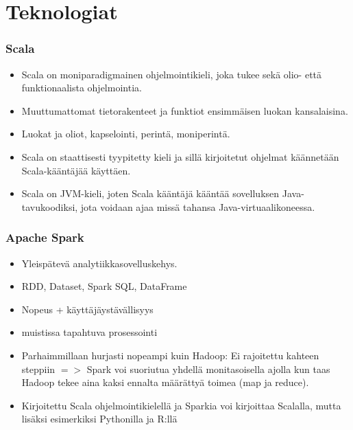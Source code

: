 \documentclass{beamer}
\begin{document}
\section{Teknologiat}

\begin{frame}
\frametitle{Scala}

\begin{itemize}
	\item Scala on moniparadigmainen ohjelmointikieli, joka tukee sekä olio- että funktionaalista ohjelmointia.
	\item Muuttumattomat tietorakenteet ja funktiot ensimmäisen luokan kansalaisina.
	\item Luokat ja oliot, kapselointi, perintä, moniperintä.
	\item Scala on staattisesti tyypitetty kieli ja sillä kirjoitetut ohjelmat käännetään Scala-kääntäjää käyttäen.
	\item Scala on JVM-kieli, joten Scala kääntäjä kääntää sovelluksen Java-tavukoodiksi, jota voidaan ajaa missä tahansa Java-virtuaalikoneessa.
\end{itemize}

\end{frame}


\begin{frame}
\frametitle{Apache Spark}

\begin{itemize}
	\item Yleispätevä analytiikkasovelluskehys.
	\item RDD, Dataset, Spark SQL, DataFrame
	\item Nopeus + käyttäjäystävällisyys
	\item muistissa tapahtuva prosessointi
	\item Parhaimmillaan hurjasti nopeampi kuin Hadoop: Ei rajoitettu kahteen steppiin $=>$ Spark voi suoriutua yhdellä monitasoisella ajolla kun taas Hadoop tekee aina kaksi ennalta määrättyä toimea (map ja reduce).
	\item Kirjoitettu Scala ohjelmointikielellä ja Sparkia voi kirjoittaa Scalalla, mutta lisäksi esimerkiksi Pythonilla ja R:llä
\end{itemize}

\end{frame}

\end{document}
